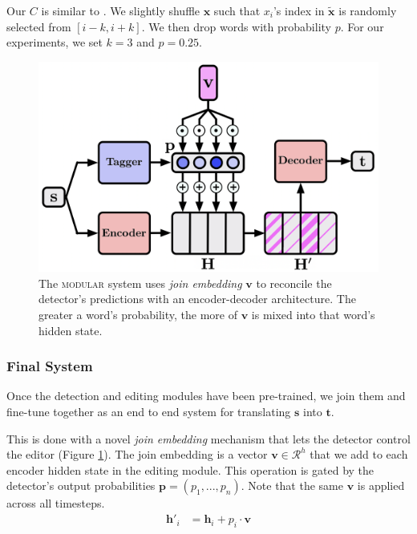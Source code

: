 Our $C$ is similar to \cite{lample2018phrase}. We slightly shuffle $\mathbf{x}$ such that $x_i$'s index in $\widetilde{\mathbf{x}}$ is randomly selected from $[i - k, i + k]$. We then drop words with probability $p$. For our experiments, we set $k = 3$ and $p = 0.25$. 

\begin{figure}[]
\includegraphics[width=1\linewidth]{editor.png}
\caption{The \textsc{modular} system uses \emph{join embedding} $\mathbf{v}$ to reconcile the detector's predictions with an encoder-decoder architecture. The greater a word's probability, the more of $\mathbf{v}$ is mixed into that word's hidden state.}
\label{figure:editor}
\end{figure}


\subsubsection{Final System} 
\label{subsubsection:modular}
Once the detection and editing modules have been pre-trained, we join them and fine-tune together as an end to end system for translating $\mathbf{s}$ into $\mathbf{t}$. 

This is done with a novel \emph{join embedding} mechanism that lets the detector control the editor (Figure \ref{figure:editor}). The join embedding is a vector $\mathbf{v} \in \mathcal{R}^h$ that we add to each encoder hidden state in the editing module. This operation is gated by the detector's output probabilities $\mathbf{p} = (p_1, ..., p_n)$. Note that the same $\mathbf{v}$ is applied across all timesteps.
\vspace*{-4pt}
\begin{align}
    \label{eq:join-embedding}
    \mathbf{h}'_i&= \mathbf{h}_i + p_i \cdot \mathbf{v} 
\end{align}

